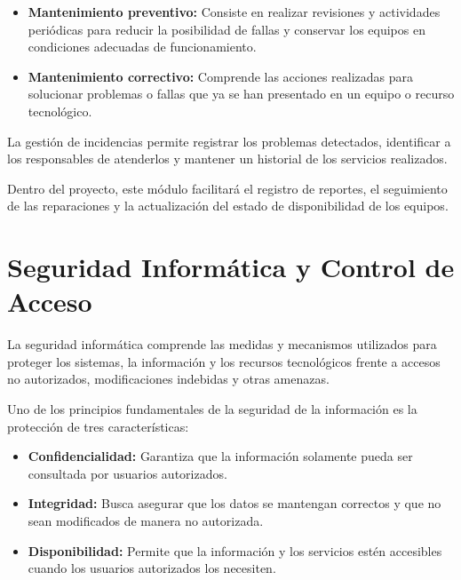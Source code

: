 \begin{itemize}

    \item \textbf{Mantenimiento preventivo:} Consiste en realizar revisiones y actividades periódicas para reducir la posibilidad de fallas y conservar los equipos en condiciones adecuadas de funcionamiento.

    \item \textbf{Mantenimiento correctivo:} Comprende las acciones realizadas para solucionar problemas o fallas que ya se han presentado en un equipo o recurso tecnológico.

\end{itemize}

La gestión de incidencias permite registrar los problemas detectados, identificar a los responsables de atenderlos y mantener un historial de los servicios realizados.

Dentro del proyecto, este módulo facilitará el registro de reportes, el seguimiento de las reparaciones y la actualización del estado de disponibilidad de los equipos.

\section{Seguridad Informática y Control de Acceso}

La seguridad informática comprende las medidas y mecanismos utilizados para proteger los sistemas, la información y los recursos tecnológicos frente a accesos no autorizados, modificaciones indebidas y otras amenazas.

Uno de los principios fundamentales de la seguridad de la información es la protección de tres características:

\begin{itemize}

    \item \textbf{Confidencialidad:} Garantiza que la información solamente pueda ser consultada por usuarios autorizados.

    \item \textbf{Integridad:} Busca asegurar que los datos se mantengan correctos y que no sean modificados de manera no autorizada.

    \item \textbf{Disponibilidad:} Permite que la información y los servicios estén accesibles cuando los usuarios autorizados los necesiten.

\end{itemize}

